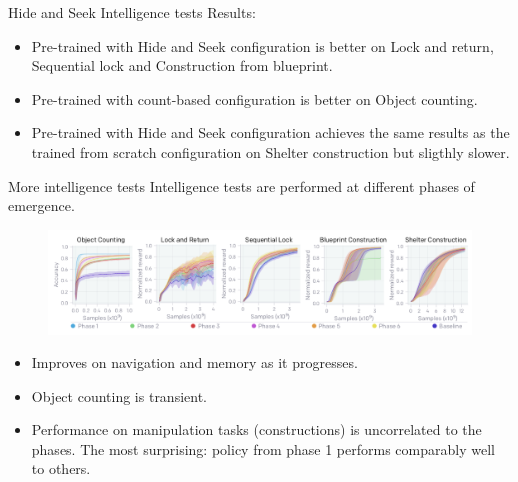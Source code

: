 \documentclass[9pt, hyperref={pdfusetitle,colorlinks=true,allcolors=DarkBlue}]{beamer}
\begin{document}
\begin{frame}{Hide and Seek Intelligence tests}
Results:
    \begin{itemize}
    \item Pre-trained with Hide and Seek configuration is better on Lock and return, Sequential lock and Construction from blueprint.
    \item Pre-trained with count-based configuration is better on Object counting.
    \item Pre-trained with Hide and Seek configuration achieves the same results as the trained from scratch configuration on Shelter construction but sligthly slower.
    \end{itemize}{}
\end{frame}{}

\begin{frame}{More intelligence tests}
Intelligence tests are performed at different phases of emergence.
\begin{figure}
    \centering
    \includegraphics[scale=0.3]{FigureA5.png}
\end{figure}{}
\begin{itemize}
    \item Improves on navigation and memory as it progresses.
    \item Object counting is transient.
    \item Performance on manipulation tasks (constructions) is uncorrelated to the phases. The most surprising: policy from phase 1 performs comparably well to others.
\end{itemize}{}
\end{frame}{}
\end{document}
